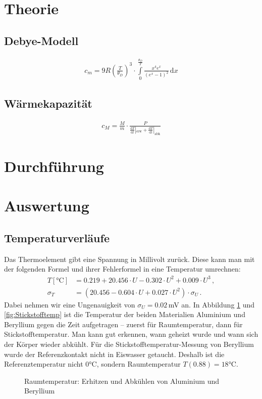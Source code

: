\documentclass[12pt,a4paper,titlepage,headinclude,bibtotoc]{scrartcl}
\newcommand{\dif}{\ensuremath{\mathrm{d}}}
\begin{document}
\section{Theorie}
\label{sec:theorie}

\subsection{Debye-Modell}
\begin{align}
	c_m=9R \left(\frac{T}{\theta_D}\right)^3\cdot\int\limits_0^\frac{\theta_D}{T} \frac{x^4 e^x}{(e^x-1)^2} \,\dif x
	\label{eq:debye}
\end{align}

\subsection{Wärmekapazität}
\begin{align}
	c_M=\frac{M}{m}\cdot\frac{P}{\frac{\dif T}{\dif t}|_\text{erw}+\frac{\dif T}{\dif t}|_\text{abk}}
	\label{eq:molWaerme}
\end{align}

\section{Durchführung}
\label{sec:durchfuehrung}

\section{Auswertung}
\label{sec:auswertung}
\subsection{Temperaturverläufe}
Das Thermoelement gibt eine Spannung in Millivolt zurück.
Diese kann man mit der folgenden Formel und ihrer Fehlerformel in eine Temperatur umrechnen:
\begin{align}
	T[\si{\celsius}]&=0.219+20.456 \cdot U - 0.302\cdot U^2+0.009\cdot U^3 \,, \\
	\sigma_T&=(20.456 - 0.604\cdot U+0.027\cdot U^2)\cdot \sigma_U\,.
\end{align}
Dabei nehmen wir eine Ungenauigkeit von $\sigma_U=0.02\,$mV an.
In Abbildung \ref{fig:Raumtemp} und \ref{fig:Stickstofftemp} ist die Temperatur der beiden Materialien Aluminium und Beryllium gegen die Zeit aufgetragen -- zuerst für Raumtemperatur, dann für Stickstofftemperatur.
Man kann gut erkennen, wann geheizt wurde und wann sich der Körper wieder abkühlt.
Für die Stickstofftemperatur-Messung von Beryllium wurde der Referenzkontakt nicht in Eiswasser getaucht.
Deshalb ist die Referenztemperatur nicht $0\si\celsius$, sondern Raumtemperatur $T(0.88)=18\si\celsius$.
\begin{figure}[!htb]
	\centering
	
	\caption{Raumtemperatur: Erhitzen und Abkühlen von Aluminium und Beryllium}
	\label{fig:Raumtemp}
\end{figure}
\end{document}
